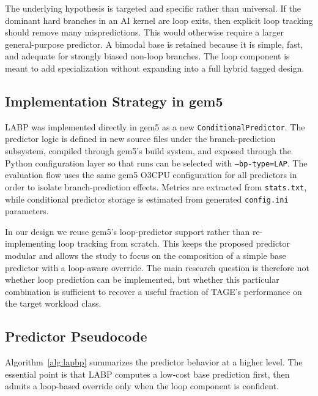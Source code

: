 \documentclass[conference]{IEEEtran}
\begin{document}
The underlying hypothesis is targeted and specific rather than universal. If the dominant hard branches in an AI kernel are loop exits, then explicit loop tracking should remove many mispredictions. This would otherwise require a larger general-purpose predictor. A bimodal base is retained because it is simple, fast, and adequate for strongly biased non-loop branches. The loop component is meant to add specialization without expanding into a full hybrid tagged design.

\subsection{Implementation Strategy in gem5}
LABP was implemented directly in gem5 as a new \texttt{ConditionalPredictor}. The predictor logic is defined in new source files under the branch-prediction subsystem, compiled through gem5's build system, and exposed through the Python configuration layer so that runs can be selected with \texttt{--bp-type=LAP}. The evaluation flow uses the same gem5 O3CPU configuration for all predictors in order to isolate branch-prediction effects. Metrics are extracted from \texttt{stats.txt}, while conditional predictor storage is estimated from generated \texttt{config.ini} parameters.

In our design we reuse gem5's loop-predictor support rather than re-implementing loop tracking from scratch. This keeps the proposed predictor modular and allows the study to focus on the composition of a simple base predictor with a loop-aware override. The main research question is therefore not whether loop prediction can be implemented, but whether this particular combination is sufficient to recover a useful fraction of TAGE's performance on the target workload class.

\subsection{Predictor Pseudocode}
Algorithm~\ref{alg:lapbp} summarizes the predictor behavior at a higher level. The essential point is that LABP computes a low-cost base prediction first, then admits a loop-based override only when the loop component is confident.
\end{document}
